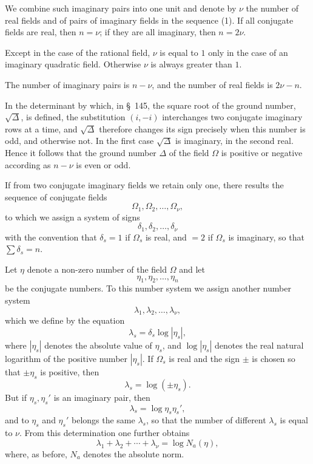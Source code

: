 \documentclass[11pt]{article}
\begin{document}
We combine such imaginary pairs into one unit and denote by $\nu$ the number of real fields and of pairs of imaginary fields in the sequence (1). If all conjugate fields are real, then $n=\nu$; if they are all imaginary, then $n=2\nu$.

Except in the case of the rational field, $\nu$ is equal to $1$ only in the case of an imaginary quadratic field. Otherwise $\nu$ is always greater than $1$.

The number of imaginary pairs is $n-\nu$, and the number of real fields is $2\nu-n$.

In the determinant by which, in \S~145, the square root of the ground number, $\sqrt{\Delta}$, is defined, the substitution $(i,-i)$ interchanges two conjugate imaginary rows at a time, and $\sqrt{\Delta}$ therefore changes its sign precisely when this number is odd, and otherwise not. In the first case $\sqrt{\Delta}$ is imaginary, in the second real. Hence it follows that the ground number $\Delta$ of the field $\Omega$ is positive or negative according as $n-\nu$ is even or odd.

If from two conjugate imaginary fields we retain only one, there results the sequence of conjugate fields
\[
\Omega_1,\Omega_2,\ldots,\Omega_\nu,
\]
to which we assign a system of signs
\[
\delta_1,\delta_2,\ldots,\delta_\nu
\]
with the convention that $\delta_s=1$ if $\Omega_s$ is real, and $=2$ if $\Omega_s$ is imaginary, so that $\sum \delta_s=n$.

Let $\eta$ denote a non-zero number of the field $\Omega$ and let
\[
\eta_1,\eta_2,\ldots,\eta_n
\]
be the conjugate numbers. To this number system we assign another number system
\[
\lambda_1,\lambda_2,\ldots,\lambda_\nu,
\]
which we define by the equation
\begin{equation}
\lambda_s=\delta_s\log |\eta_s|,
\tag{2}
\end{equation}
where $|\eta_s|$ denotes the absolute value of $\eta_s$, and $\log|\eta_s|$ denotes the real natural logarithm of the positive number $|\eta_s|$. If $\Omega_s$ is real and the sign $\pm$ is chosen so that $\pm\eta_s$ is positive, then
\[
\lambda_s=\log(\pm\eta_s).
\]
But if $\eta_s,\eta_s'$ is an imaginary pair, then
\[
\lambda_s=\log\eta_s\eta_s',
\]
and to $\eta_s$ and $\eta_s'$ belongs the same $\lambda_s$, so that the number of different $\lambda_s$ is equal to $\nu$. From this determination one further obtains
\begin{equation}
\lambda_1+\lambda_2+\cdots+\lambda_\nu=\log N_a(\eta),
\tag{3}
\end{equation}
where, as before, $N_a$ denotes the absolute norm.
\end{document}
